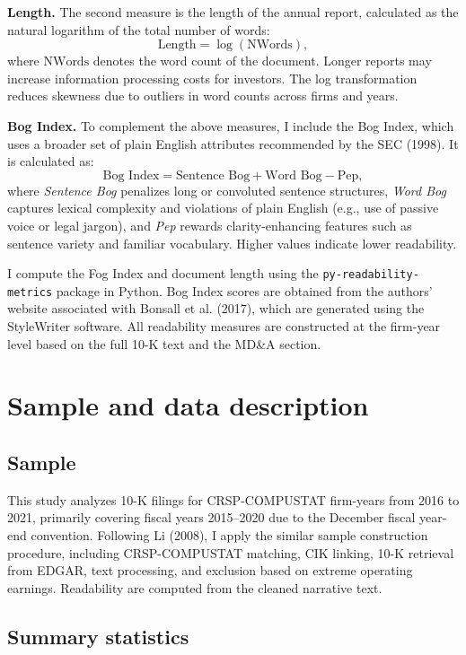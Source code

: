 \documentclass[a4paper]{article}
\begin{document}
\textbf{Length.} The second measure is the length of the annual report, calculated as the natural logarithm of the total number of words:
\[
\text{Length} = \log(\text{NWords}),
\]
where $\text{NWords}$ denotes the word count of the document. Longer reports may increase information processing costs for investors. The log transformation reduces skewness due to outliers in word counts across firms and years.

\textbf{Bog Index.} To complement the above measures, I include the Bog Index, which uses a broader set of plain English attributes recommended by the SEC (1998). It is calculated as:
\[
\text{Bog Index} = \text{Sentence Bog} + \text{Word Bog} - \text{Pep},
\]
where \textit{Sentence Bog} penalizes long or convoluted sentence structures, \textit{Word Bog} captures lexical complexity and violations of plain English (e.g., use of passive voice or legal jargon), and \textit{Pep} rewards clarity-enhancing features such as sentence variety and familiar vocabulary. Higher values indicate lower readability.

I compute the Fog Index and document length using the \texttt{py-readability-metrics} package in Python. Bog Index scores are obtained from the authors’ website associated with Bonsall et al. (2017), which are generated using the StyleWriter software. All readability measures are constructed at the firm-year level based on the full 10-K text and the MD\&A section.


\section{Sample and data description}
\subsection{Sample}
This study analyzes 10-K filings for CRSP-COMPUSTAT firm-years from 2016 to 2021, primarily covering fiscal years 2015–2020 due to the December fiscal year-end convention. Following Li (2008), I apply the similar sample construction procedure, including CRSP-COMPUSTAT matching, CIK linking, 10-K retrieval from EDGAR, text processing, and exclusion based on extreme operating earnings. Readability are computed from the cleaned narrative text. 

\subsection{Summary statistics}
\end{document}
